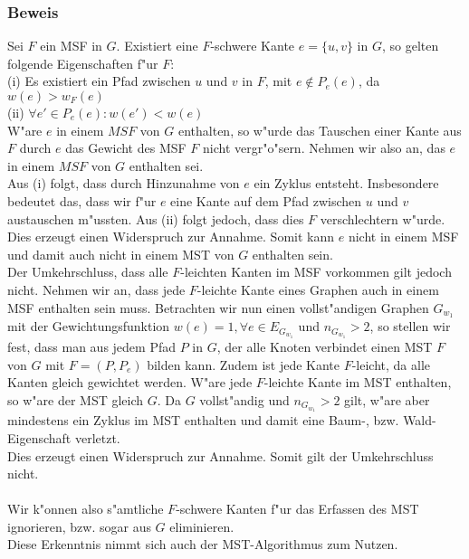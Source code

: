 \subsubsection{Beweis}
\label{sec:fProof}

Sei $F$ ein MSF in $G$.
    Existiert eine $F$-schwere Kante $e=\{u, v\}$ in $G$, so gelten folgende 
    Eigenschaften f"ur $F$:\\
(i) Es existiert ein Pfad zwischen $u$ und $v$ in $F$, mit $e \not \in P_e(e)$,
    da $w(e) > w_F(e)$\\
(ii) $\forall e' \in P_e(e) : w(e') < w(e)$\\
W"are $e$ in einem $MSF$ von $G$ enthalten, so w"urde das Tauschen einer Kante aus
    $F$ durch $e$ das Gewicht des MSF $F$ nicht vergr"o"sern.
    Nehmen wir also an, das $e$ in einem $MSF$ von $G$ enthalten sei.\\
Aus (i) folgt, dass durch Hinzunahme von $e$ ein Zyklus entsteht. 
    Insbesondere bedeutet das, 
    dass wir f"ur $e$ eine Kante auf dem Pfad zwischen $u$ und $v$ austauschen
    m"ussten.
    Aus (ii) folgt jedoch, dass dies $F$ verschlechtern w"urde.
    Dies erzeugt einen Widerspruch zur Annahme.
    Somit kann $e$ nicht in einem MSF und damit auch nicht in einem MST
    von $G$ enthalten sein.\\
Der Umkehrschluss, dass alle $F$-leichten Kanten im MSF vorkommen gilt jedoch
    nicht.
    Nehmen wir an, dass jede $F$-leichte Kante eines Graphen auch in einem
    MSF enthalten sein muss.
    Betrachten wir nun einen vollst"andigen Graphen $G_{w_1}$ mit der 
    Gewichtungsfunktion $w(e) = 1, \forall e \in E_{G_{w_1}}$ und 
    $n_{G_{w_1}} > 2$, so stellen wir fest, dass man aus jedem Pfad $P$ in $G$, 
    der alle
    Knoten verbindet einen MST $F$ von $G$ mit $F=(P, P_e)$ 
    bilden kann.
    Zudem ist jede Kante $F$-leicht, da alle Kanten gleich gewichtet werden.
    W"are jede $F$-leichte Kante im MST enthalten, so w"are der MST gleich $G$.
    Da $G$ vollst"andig und $n_{G_{w_1}} > 2$ gilt, w"are aber mindestens ein Zyklus im 
    MST enthalten und damit eine Baum-, bzw. Wald-Eigenschaft verletzt.\\
    Dies erzeugt einen Widerspruch zur Annahme.
    Somit gilt der Umkehrschluss nicht.\\
\\
Wir k"onnen also s"amtliche $F$-schwere Kanten f"ur das Erfassen des MST 
    ignorieren, bzw. sogar aus $G$ eliminieren.\\
Diese Erkenntnis nimmt sich auch der MST-Algorithmus zum Nutzen.\\

